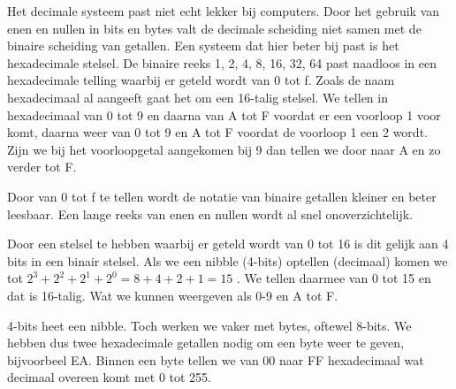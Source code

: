 Het decimale systeem past niet echt lekker bij computers. Door het gebruik van enen en nullen in bits en bytes valt de decimale scheiding niet samen met de binaire scheiding van getallen. Een systeem dat hier beter bij past is het hexadecimale stelsel. De binaire reeks 1, 2, 4, 8, 16, 32, 64 past naadloos in een hexadecimale telling waarbij er geteld wordt van 0 tot f. Zoals de naam hexadecimaal al aangeeft gaat het om een 16-talig stelsel. We tellen in hexadecimaal van 0 tot 9 en daarna van A tot F voordat er een voorloop 1 voor komt, daarna weer van 0 tot 9 en A tot F voordat de voorloop 1 een 2 wordt. Zijn we bij het voorloopgetal aangekomen bij 9 dan tellen we door naar A en zo verder tot F.

Door van 0 tot f te tellen wordt de notatie van binaire getallen kleiner en beter leesbaar. Een lange reeks van enen en nullen wordt al snel onoverzichtelijk.

Door een stelsel te hebben waarbij er geteld wordt van 0 tot 16 is dit gelijk aan 4 bits in een binair stelsel.
Als we een nibble (4-bits) optellen (decimaal) komen we tot
\begin{math}
2^3 + 2^2 + 2^1 + 2^0 = 8 + 4 + 2 + 1 = 15
\end{math}
. We tellen daarmee van 0 tot 15 en dat is 16-talig. Wat we kunnen weergeven als 0-9 en A tot F.

4-bits heet een nibble. Toch werken we vaker met bytes, oftewel 8-bits. We hebben dus twee hexadecimale getallen nodig om een byte weer te geven, bijvoorbeel EA. Binnen een byte tellen we van 00 naar FF hexadecimaal wat decimaal overeen komt met 0 tot 255.

